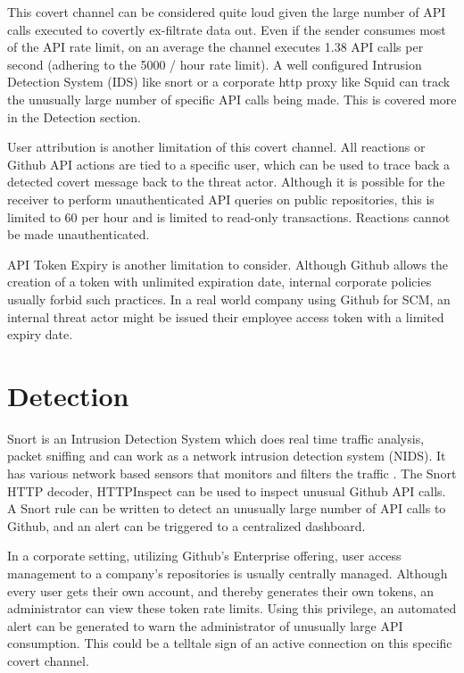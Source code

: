 \documentclass[conference]{IEEEtran}
\begin{document}
This covert channel can be considered quite loud given the large number of API calls executed to covertly ex-filtrate data out. Even if the sender consumes most of the API rate limit, on an average the channel executes 1.38 API calls per second (adhering to the 5000 / hour rate limit). A well configured Intrusion Detection System (IDS) like snort or a corporate http proxy like Squid can track the unusually large number of specific API calls being made. This is covered more in the Detection section.

User attribution is another limitation of this covert channel. All reactions or Github API actions are tied to a specific user, which can be used to trace back a detected covert message back to the threat actor. Although it is possible for the receiver to perform unauthenticated API queries on public repositories, this is limited to 60 per hour and is limited to read-only transactions. Reactions cannot be made unauthenticated.

API Token Expiry is another limitation to consider. Although Github allows the creation of a token with unlimited expiration date, internal corporate policies usually forbid such practices. In a real world company using Github for SCM, an internal threat actor might be issued their employee access token with a limited expiry date. 

\section{Detection}

Snort is an Intrusion Detection System which does real time traffic analysis, packet sniffing and can work as a network intrusion detection system (NIDS). It has various network based sensors that monitors and filters the traffic \cite{b9}. The Snort HTTP decoder, HTTPInspect can be used to inspect unusual Github API calls. A Snort rule can be written to detect an unusually large number of API calls to Github, and an alert can be triggered to a centralized dashboard. 

In a corporate setting, utilizing Github’s Enterprise offering, user access management to a company’s repositories is usually centrally managed. Although every user gets their own account, and thereby generates their own tokens, an administrator can view these token rate limits. Using this privilege, an automated alert can be generated to warn the administrator of unusually large API consumption. This could be a telltale sign of an active connection on this specific covert channel.
\end{document}
